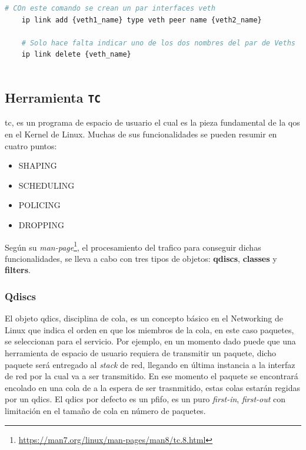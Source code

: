 \begin{lstlisting}[language= bash, style=Consola, caption={Uso de las interfaces Veths},label=code:iproute2_veth]
    # COn este comando se crean un par interfaces veth
    ip link add {veth1_name} type veth peer name {veth2_name}
    
    # Solo hace falta indicar uno de los dos nombres del par de Veths
    ip link delete {veth_name}
    
\end{lstlisting}
\vspace{0.5cm}



\subsection{Herramienta \texttt{TC}}


\gls{tc}, es un programa de espacio de usuario el cual es la pieza fundamental de la \gls{qos} en el Kernel de Linux. Muchas de sus funcionalidades se pueden resumir en cuatro puntos:

\begin{itemize}
    \item \textsc{SHAPING}
    \item \textsc{SCHEDULING}
    \item \textsc{POLICING}
    \item \textsc{DROPPING}
\end{itemize}

Según su \textit{man-page}\footnote{\url{https://man7.org/linux/man-pages/man8/tc.8.html}}, el procesamiento del trafico para conseguir dichas funcionalidades, se lleva a cabo con tres tipos de objetos: \textbf{qdiscs}, \textbf{classes} y \textbf{filters}.

\subsubsection{Qdiscs}

El objeto \gls{qdics}, disciplina de cola, es un concepto básico en el Networking de Linux que indica el orden en que los miembros de la cola, en este caso paquetes, se seleccionan para el servicio. Por ejemplo, en un momento dado puede que una herramienta de espacio de usuario requiera de transmitir un paquete, dicho paquete será entregado al \textit{stack} de red, llegando en última instancia a la interfaz de red por la cual va a ser transmitido. En ese momento el paquete se encontrará encolado en una cola de a la espera de ser trasnmitido, estas colas estarán regidas por un \gls{qdics}. El \gls{qdics} por defecto es un pfifo, es un puro \textit{first-in}, \textit{first-out} con limitación en el tamaño de cola en número de paquetes.


